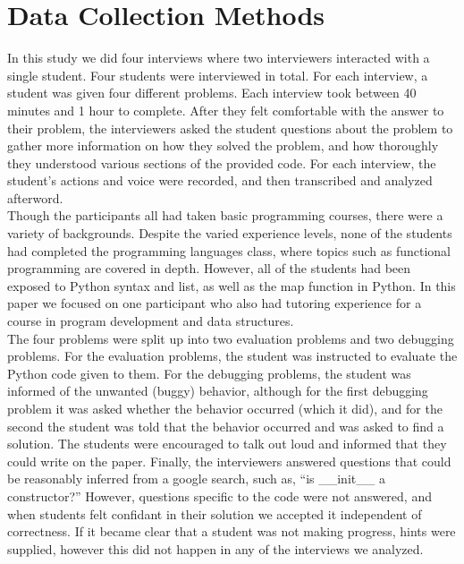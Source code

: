 \documentclass{article}
\begin{document}
\newpage
\section{Data Collection Methods}

In this study we did four interviews where two interviewers interacted with a single student. Four students were interviewed in total.
For each interview, a student was given four different problems. Each interview took between 40 minutes and 1 hour to complete.
After they felt comfortable with the answer to their problem,
 the interviewers asked the student questions about the problem to gather more information on how they solved the problem,
 and how thoroughly they understood various sections of the provided code.
For each interview, the student's actions and voice were recorded, and then transcribed and analyzed afterword. \\

Though the participants all had taken basic programming courses, there were a variety of backgrounds.
Despite the varied experience levels, none of the students had completed the programming languages class, where topics such as functional programming are covered in depth.
However, all of the students had been exposed to Python syntax and list, as well as the map function in Python.
In this paper we focused on one participant who also had tutoring experience for a course in program development and data structures. \\

The four problems were split up into two evaluation problems and two debugging problems.
For the evaluation problems, the student was instructed to evaluate the Python code given to them.
For the debugging problems, the student was informed of the unwanted (buggy) behavior,
 although for the first debugging problem it was asked whether the behavior occurred (which it did),
 and for the second the student was told that the behavior occurred and was asked to find a solution.
The students were encouraged to talk out loud and informed that they could write on the paper.
Finally, the interviewers answered questions that could be reasonably inferred from a google search, such as,
``is \_\_init\_\_ a constructor?''
However, questions specific to the code were not answered, and when students felt confidant in their solution we accepted it independent of correctness.
If it became clear that a student was not making progress, hints were supplied, however this did not happen in any of the interviews we analyzed.
\end{document}
